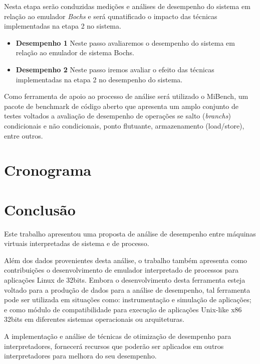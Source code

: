 \documentclass[11pt,twoside]{article}
\begin{document}
Nesta etapa serão conduzidas medições e análises de desempenho do sistema em relação ao emulador \emph{Bochs} e será qunatificado o impacto das técnicas implementadas na etapa 2 no sistema.

\begin{itemize}
 \item \textbf{Desempenho 1} Neste passo avaliaremos o desempenho do sistema em relação ao emulador de sistema Bochs.
 \item \textbf{Desempenho 2} Neste passo iremos avaliar o efeito das técnicas implementadas na etapa 2 no desempenho do sistema.
\end{itemize}

Como ferramenta de apoio ao processo de análise será utilizado o MiBench\cite{Guthaus2001}, um pacote de benchmark de código aberto que apresenta um amplo conjunto de testes voltados a avaliação de desempenho de operações se salto (\emph{branchs}) condicionais e não condicionais, ponto flutuante, armazenamento (load/store), entre outros.
 

\section{Cronograma}

\section{Conclusão}

Este trabalho apresentou uma proposta de análise de desempenho entre máquinas virtuais interpretadas de sistema e de processo.

Além dos dados provenientes desta análise, o trabalho também apresenta como contribuições o desenvolvimento de emulador interpretado de processos para aplicações Linux de 32bits.
Embora o desenvolvimento desta ferramenta esteja voltado para a produção de dados para a análise de desempenho, tal ferramenta pode ser utilizada em situações como: instrumentação e simulação de aplicações; e como 
módulo de compatibilidade para execução de aplicações Unix-like x86 32bits em diferentes sistemas operacionais ou arquiteturas.

A implementação e análise de técnicas de otimização de desempenho para interpretadores, fornecerá recursos que poderão ser aplicados em outros interpretadores para melhora do seu desempenho. 


\end{document}

